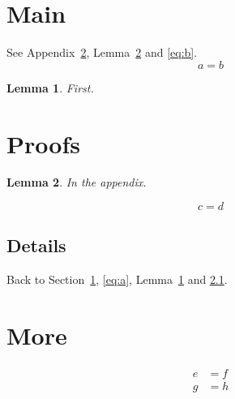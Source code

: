 \documentclass{article}
\numberwithin{equation}{section}
\newtheorem{lemma}{Lemma}[section]
\begin{document}
\tableofcontents
\section{Main}\label{sec:main}
See Appendix~\ref{app:proofs}, Lemma~\ref{lem:b} and \eqref{eq:b}.
\begin{equation}
a = b \label{eq:a}
\end{equation}
\begin{lemma}\label{lem:a} First. \end{lemma}
\appendix
\section{Proofs}\label{app:proofs}
\begin{lemma}\label{lem:b} In the appendix. \end{lemma}
\begin{equation}
c = d \label{eq:b}
\end{equation}
\subsection{Details}\label{app:details}
Back to Section~\ref{sec:main}, \eqref{eq:a}, Lemma~\ref{lem:a} and \ref{app:details}.
\section{More}
\begin{align}
e &= f \\ g &= h
\end{align}
\end{document}
